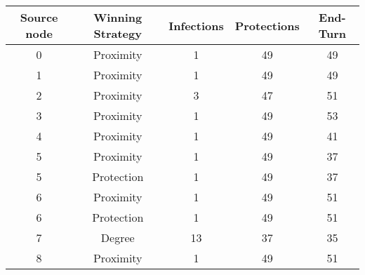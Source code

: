\documentclass[results.tex]{subfiles}
\begin{document}
    \begin{center}
        \begin{tabular}{| c || c | c | c | c |}
            \hline
            {\bfseries Source node} & {\bfseries Winning Strategy} & {\bfseries Infections} & {\bfseries Protections}
            & {\bfseries End-Turn}
            \\  %
            \hline\hline
            0                       & Proximity                    & 1                      & 49                      & 49                   \\
            \hline
            1                       & Proximity                    & 1                      & 49                      & 49                   \\
            \hline
            2                       & Proximity                    & 3                      & 47                      & 51                   \\
            \hline
            3                       & Proximity                    & 1                      & 49                      & 53                   \\
            \hline
            4                       & Proximity                    & 1                      & 49                      & 41                   \\
            \hline
            5                       & Proximity                    & 1                      & 49                      & 37                   \\
            \hline
            5                       & Protection                   & 1                      & 49                      & 37                   \\
            \hline
            6                       & Proximity                    & 1                      & 49                      & 51                   \\
            \hline
            6                       & Protection                   & 1                      & 49                      & 51                   \\
            \hline
            7                       & Degree                       & 13                     & 37                      & 35                   \\
            \hline
            8                       & Proximity                    & 1                      & 49                      & 51                   \\

\end{tabular}
\end{center}
\end{document}
